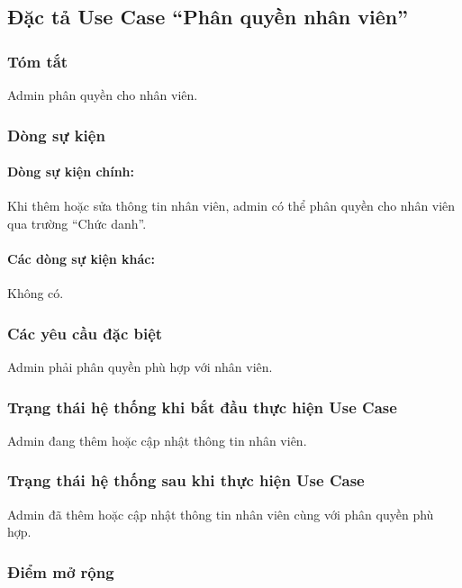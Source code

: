 \subsection{Đặc tả Use Case ``Phân quyền nhân viên''}

\subsubsection{Tóm tắt}
Admin phân quyền cho nhân viên.

\subsubsection{Dòng sự kiện}
\paragraph{\textbf{Dòng sự kiện chính:}}
Khi thêm hoặc sửa thông tin nhân viên, admin có thể phân quyền cho nhân viên qua trường ``Chức danh''.

\paragraph{\textbf{Các dòng sự kiện khác:}}
Không có.

\subsubsection{Các yêu cầu đặc biệt}
Admin phải phân quyền phù hợp với nhân viên.

\subsubsection{Trạng thái hệ thống khi bắt đầu thực hiện Use Case}
Admin đang thêm hoặc cập nhật thông tin nhân viên.

\subsubsection{Trạng thái hệ thống sau khi thực hiện Use Case}
Admin đã thêm hoặc cập nhật thông tin nhân viên cùng với phân quyền phù hợp.

\subsubsection{Điểm mở rộng}